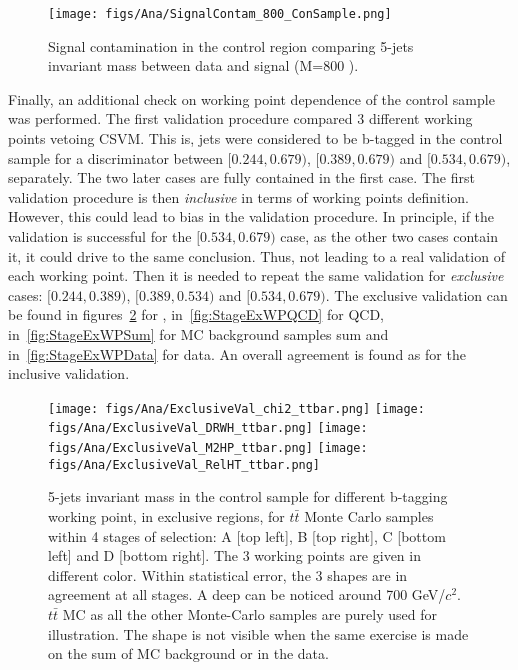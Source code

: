 \begin{figure}[!Hhtbp]
  \begin{center}
    \texttt{[image: figs/Ana/SignalContam\_800\_ConSample.png]}
    \caption{Signal contamination in the control region comparing 5-jets invariant mass between data and signal (M=800 \GeVcc).}
    \label{fig:SigContamination}
  \end{center}
\end{figure}

Finally, an additional check on working point dependence of the control sample was performed. The first validation procedure compared 3 different working points vetoing CSVM. This is, jets were considered to be b-tagged in the control sample for a discriminator between $[0.244,0.679)$, $[0.389,0.679)$ and $[0.534,0.679)$, separately. The two later cases are fully contained in the first case. The first validation procedure is then \textit{inclusive} in terms of working points definition. However, this could lead to bias in the validation procedure. In principle, if the validation is successful for the $[0.534,0.679)$ case, as the other two cases contain it, it could drive to the same conclusion. Thus, not leading to a real validation of each working point. Then it is needed to repeat the same validation for \textit{exclusive} cases: $[0.244,0.389)$, $[0.389,0.534)$ and $[0.534,0.679)$. The exclusive validation can be found in figures~\ref{fig:StageExWPttbar} for \ttbar, in~\ref{fig:StageExWPQCD} for QCD, in~\ref{fig:StageExWPSum} for MC background samples sum and in~\ref{fig:StageExWPData} for data. An overall agreement is found as for the inclusive validation.

\begin{figure}[!Hhtbp]
  \begin{center}
    \texttt{[image: figs/Ana/ExclusiveVal\_chi2\_ttbar.png]}
    \texttt{[image: figs/Ana/ExclusiveVal\_DRWH\_ttbar.png]}
    \texttt{[image: figs/Ana/ExclusiveVal\_M2HP\_ttbar.png]}
    \texttt{[image: figs/Ana/ExclusiveVal\_RelHT\_ttbar.png]}
    \caption{5-jets invariant mass in the control sample for different b-tagging working point, in exclusive regions, for $t\bar{t}$ Monte Carlo samples within 4 stages of selection: A [top left], B [top right], C [bottom left] and D [bottom right]. The 3 working points are given in different color. Within statistical error, the 3 shapes are in agreement at all stages. A deep can be noticed around 700 GeV/$c^{2}$. $t\bar{t}$ MC as all the other Monte-Carlo samples are purely used for illustration. The shape is not visible when the same exercise is made on the sum of MC background or in the data.}
    \label{fig:StageExWPttbar}
  \end{center}
\end{figure}

